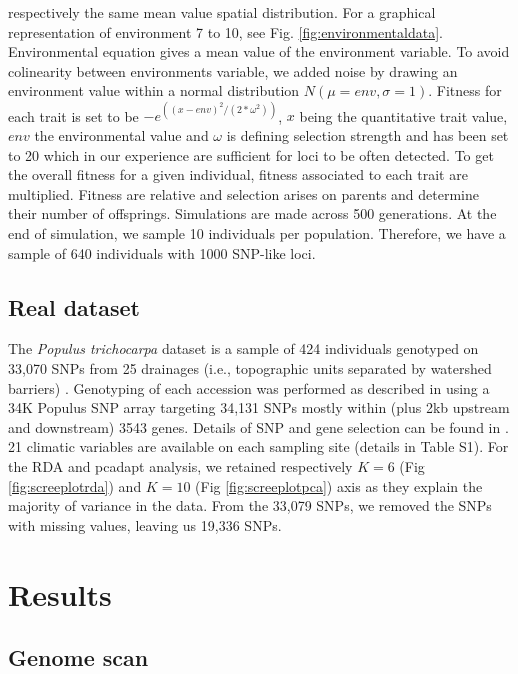 \documentclass[a4paper,times,10pt,authoryear]{article}%
\begin{document}
respectively the same mean value spatial distribution. For a graphical representation of environment 7 to 10, see Fig. \ref{fig:environmentaldata}. Environmental equation gives a mean value of the environment variable. To avoid colinearity between environments variable, we added noise by drawing an environment value within a normal distribution $N(\mu=env, \sigma=1)$. Fitness for each trait is set to be $-e^{((x-env)^2/(2*\omega^2))}$, $x$ being the quantitative trait value, $env$ the environmental value and $\omega$ is defining selection strength and has been set to 20 which in our experience are sufficient for loci to be often detected. To get the overall fitness for a given individual, fitness associated to each trait are multiplied. Fitness are relative and selection arises on parents and determine their number of offsprings. Simulations are made across 500 generations. At the end of simulation, we sample 10 individuals per population. Therefore, we have a sample of 640 individuals with 1000 SNP-like loci.

\subsection{Real dataset}

The \textit{Populus trichocarpa} dataset is a sample of 424 individuals genotyped on 33,070 SNPs from 25 drainages (i.e., topographic units separated by watershed barriers) \citep{Geraldes2014}. Genotyping of each accession was performed as described in \citep{Geraldes2013} using a 34K Populus SNP array targeting 34,131 SNPs mostly within (plus 2kb upstream and downstream) 3543 genes. Details of SNP and gene selection can be found in \citep{Geraldes2013}. 21 climatic variables are available on each sampling site (details in Table S1). For the RDA and pcadapt analysis, we retained respectively $K=6$ (Fig \ref{fig:screeplotrda}) and $K=10$ (Fig \ref{fig:screeplotpca}) axis as they explain the majority of variance in the data. From the 33,079 SNPs, we removed the SNPs with missing values, leaving us 19,336 SNPs.


\section{Results}

\subsection{Genome scan}
\end{document}

